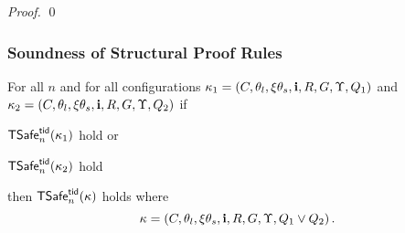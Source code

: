\begin{proof}
%
\qed\end{proof}




\subsubsection{Soundness of Structural Proof Rules} %
\label{sec:sound:structural}



\begin{lemma}[Disj]\label{lem:disj}
For all $n$ and for all 
configurations 
$\kappa_1=(C,\theta_l,\xi\theta_s,{\bf i},R,G,\Upsilon, Q_1)$
and
$\kappa_2=(C,\theta_l,\xi\theta_s,{\bf i},R,G,\Upsilon, Q_2)$
if  
\begin{compactenum}[(i)]
\item \label{lem:iter:safea}
${\sf TSafe}^{{\sf tid}}_n(\kappa_1)$   hold or    %
\item \label{lem:iter:safeb}
 ${\sf TSafe}^{{\sf tid}}_n(\kappa_2)$ hold    %
\end{compactenum}
then  
${\sf TSafe}^{{\sf tid}}_n(\kappa)$ holds 
where 
$$\kappa=(C,\theta_l,\xi\theta_s,{\bf i},R,G,\Upsilon, Q_1 \lor Q_2)\,.$$
\end{lemma}

